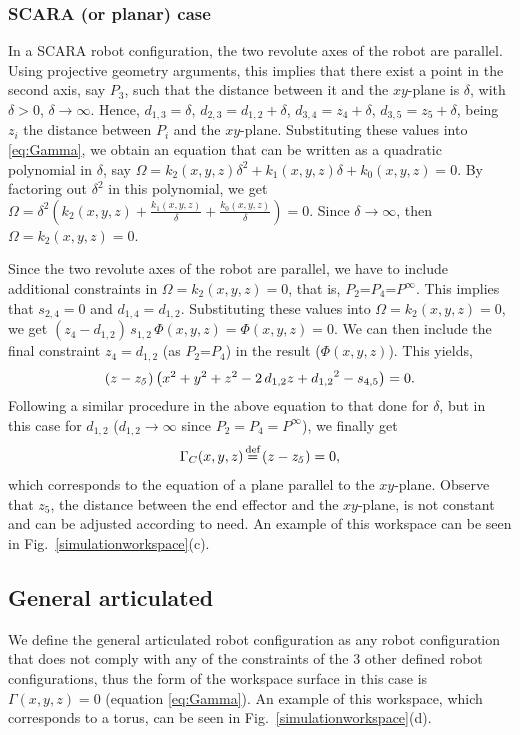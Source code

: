 \subsubsection{SCARA (or planar) case}
In a SCARA robot configuration, the two revolute axes of the robot are parallel. Using projective geometry arguments, this implies that there exist a point in the second axis, say $P_3$, such that the distance between it and the $xy$-plane is $\delta$, with $\delta>0$, $\delta \to \infty$. Hence, $d_{1,3}=\delta$, $d_{2,3}=d_{1,2}+\delta$, $d_{3,4}=z_{4}+\delta$, $d_{3,5}=z_{5}+\delta$, being $z_{i}$ the distance between $P_i$ and the $xy$-plane. Substituting these values into \eqref{eq:Gamma}, we obtain an equation that can be written as a quadratic polynomial in $\delta$, say $\Omega = k_2(x,y,z)\delta^2+k_1(x,y,z)\delta+k_0(x,y,z) = 0$. By factoring out $\delta^2$ in this polynomial, we get $\Omega =\delta^2(k_2(x,y,z)+\frac{k_1(x,y,z)}{\delta}+\frac{k_0(x,y,z)}{\delta})=0$. Since $\delta \to \infty$, then $\Omega = k_2(x,y,z)=0$. 

Since the two revolute axes of the  robot are  parallel, we have to include additional constraints in $\Omega=k_2(x,y,z)=0$, that is, $P_2$=$P_4$=$P^\infty$. This implies that $s_{2, 4} = 0$ and $d_{1, 4} = d_{1, 2}$. Substituting these values into $\Omega=k_2(x,y,z)=0$, we get $(z_4-d_{1, 2})\,s_{1, 2}\,\Phi(x,y,z) = \Phi(x,y,z) = 0$. We can then include the final constraint $z_4 = d_{1, 2}$ (as $P_2$=$P_4$) in the result ($\Phi(x,y,z)$). This yields,
\begin{equation*}
     \left( z-{\it z_5} \right)  \left( {x}^{2}+{y}^{2}+{z}^{2}-2\,d_{{1,2}
}z+{d_{{1,2}}}^{2}-s_{{4,5}} \right) = 0.
\end{equation*}
Following a similar procedure in the above equation to that done for $\delta$, but in this case for $d_{1,2}$ ($d_{1,2} \to \infty$ since $P_2=P_4=P^\infty$), we finally get
\begin{align}
    \Gamma_C(x, y, z) \myeq \left( z-{\it z_5} \right)=0, \label{eq:GammaSCARA}
\end{align}
which corresponds to the equation of a plane parallel to the $xy$-plane. Observe that $z_5$, the distance between the end effector and the $xy$-plane, is not constant and can be adjusted according to need. An example of this workspace can be seen in Fig.~\ref{simulationworkspace}(c).

\subsection{General articulated}
We define the general articulated robot configuration as any robot configuration that does not comply with any of the constraints of the 3 other defined robot configurations, thus the form of the workspace surface in this case is $\Gamma(x, y, z)=0$ (equation \eqref{eq:Gamma}). An example of this workspace, which corresponds to a torus, can be seen in Fig.~\ref{simulationworkspace}(d).

